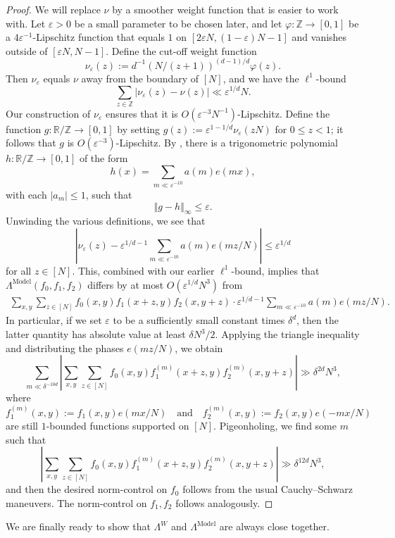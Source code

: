 \documentclass[11pt]{amsart}
\theoremstyle{definition}
\newcommand{\R}{{\mathbb R}}
\newcommand{\Z}{{\mathbb Z}}
\newcommand{\eps}{\varepsilon}
\newcommand{\norm}[1]{\left\Vert #1\right\Vert}
\newcommand{\veps}{\varepsilon}
\newcommand{\model}{{\mathrm{Model}}}
\newcommand{\abs}[1]{\mathopen{}\left| #1\mathclose{}\right|}
\newcommand{\brac}[1]{\mathopen{}\left( #1 \mathclose{}\right)}
\begin{document}
\begin{proof}
We will replace $\nu$ by a smoother weight function that is easier to work with.  Let $\veps>0$ be a small parameter to be chosen later, and let $\varphi: \Z \to [0,1]$ be a $4\veps^{-1}$-Lipschitz function that equals $1$ on $[2\veps N, (1-\veps)N-1]$ and vanishes outside of $[\veps N, N-1]$.  Define the cut-off weight function
$$\nu_{\veps}(z):= d^{-1} (N/(z+1))^{(d-1)/d}\varphi(z).$$
Then $\nu_{\eps}$ equals $\nu$ away from the boundary of $[N]$, and we have the $\ell^1$-bound
$$\sum_{z \in \Z} \abs{\nu_{\veps}(z)-\nu(z)} \ll \veps^{1/d}N.$$
Our construction of $\nu_{\veps}$ ensures that it is $O\brac{\veps^{-3}N^{-1}}$-Lipschitz.  Define the function $g: \R/\Z \to [0,1]$ by setting $g(z):=\veps^{1-1/d}\nu_{\eps}(zN)$ for $0 \leq z<1$; it follows that $g$ is $O\brac{\veps^{-3}}$-Lipschitz. By \cite[Lemma 4.1]{OP23}, there is a trigonometric polynomial $h: \R/\Z \to [0,1]$ of the form
$$h(x)=\sum_{m \ll \veps^{-10}} a(m) e(mx),$$
with each $|a_m| \leq 1$, such that
$$\norm{g-h}_\infty \leq \veps.$$
Unwinding the various definitions, we see that
$$\abs{\nu_{\veps}(z)-\veps^{1/d-1}\sum_{m \ll \veps^{-10}} a(m) e(mz/N)} \leq \veps^{1/d}$$
for all $z \in [N]$.  This, combined with our earlier $\ell^1$-bound, implies that $\Lambda^{\model}(f_0, f_1, f_2)$ differs by at most $O\brac{\veps^{1/d}N^3}$ from
\begin{align*}
\sum_{x,y}\sum_{z \in [N]} f_0(x,y)f_1(x+z,y)f_2(x,y+z) \cdot \veps^{1/d-1}\sum_{m \ll \veps^{-10}} a(m) e(mz/N).
\end{align*}
In particular, if we set $\veps$ to be a sufficiently small constant times $\delta^d$, then the latter quantity has absolute value at least $\delta N^3/2$.  Applying the triangle inequality and distributing the phases $e(mz/N)$, we obtain
$$\sum_{m \ll \delta^{-10d}} \abs{\sum_{x,y}\sum_{z \in [N]} f_0(x,y)f_1^{(m)}(x+z,y)f_2^{(m)}(x,y+z)} \gg \delta^{2d} N^3,$$
where
$$f_1^{(m)}(x,y):=f_1(x,y)e(mx/N) \quad \text{and} \quad f_2^{(m)}(x,y):=f_2(x,y)e(-mx/N)$$
are still $1$-bounded functions supported on $[N]$.  Pigeonholing, we find some $m$ such that
$$\abs{\sum_{x,y}\sum_{z \in [N]} f_0(x,y)f_1^{(m)}(x+z,y)f_2^{(m)}(x,y+z)} \gg \delta^{12d} N^3,$$
and then the desired norm-control on $f_0$ follows from the usual Cauchy--Schwarz maneuvers.  The norm-control on $f_1,f_2$ follows analogously.
\end{proof}


We are finally ready to show that $\Lambda^W$ and $\Lambda^\model$ are always close together.
\end{document}
